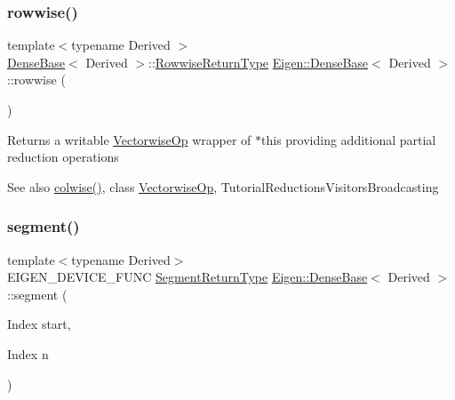 \subsubsection{\texorpdfstring{rowwise()}{rowwise()}\hspace{0.1cm}{\footnotesize\ttfamily [2/2]}}
{\footnotesize\ttfamily template$<$typename Derived $>$ \\
\mbox{\hyperlink{class_eigen_1_1_dense_base}{Dense\+Base}}$<$ Derived $>$\+::\mbox{\hyperlink{class_eigen_1_1_vectorwise_op}{Rowwise\+Return\+Type}} \mbox{\hyperlink{class_eigen_1_1_dense_base}{Eigen\+::\+Dense\+Base}}$<$ Derived $>$\+::rowwise (\begin{DoxyParamCaption}{ }\end{DoxyParamCaption})\hspace{0.3cm}{\ttfamily [inline]}}

\begin{DoxyReturn}{Returns}
a writable \mbox{\hyperlink{class_eigen_1_1_vectorwise_op}{Vectorwise\+Op}} wrapper of $\ast$this providing additional partial reduction operations
\end{DoxyReturn}
\begin{DoxySeeAlso}{See also}
\mbox{\hyperlink{class_eigen_1_1_dense_base_a1c0e1b6067ec1de6cb8799da55aa7d30}{colwise()}}, class \mbox{\hyperlink{class_eigen_1_1_vectorwise_op}{Vectorwise\+Op}}, Tutorial\+Reductions\+Visitors\+Broadcasting 
\end{DoxySeeAlso}
\mbox{\label{class_eigen_1_1_dense_base_a12704b924ecc7161a38b123901e9cc9e}} 
\subsubsection{\texorpdfstring{segment()}{segment()}\hspace{0.1cm}{\footnotesize\ttfamily [1/2]}}
{\footnotesize\ttfamily template$<$typename Derived$>$ \\
E\+I\+G\+E\+N\+\_\+\+D\+E\+V\+I\+C\+E\+\_\+\+F\+U\+NC \mbox{\hyperlink{class_eigen_1_1_vector_block}{Segment\+Return\+Type}} \mbox{\hyperlink{class_eigen_1_1_dense_base}{Eigen\+::\+Dense\+Base}}$<$ Derived $>$\+::segment (\begin{DoxyParamCaption}\item[{Index}]{start,  }\item[{Index}]{n }\end{DoxyParamCaption})\hspace{0.3cm}{\ttfamily [inline]}}

